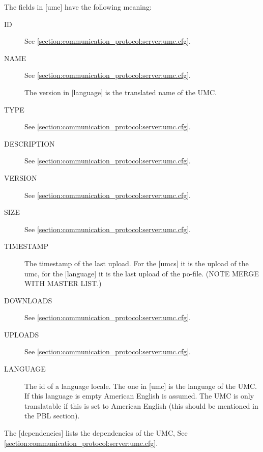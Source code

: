 The fields in [umc] have the following meaning:
\begin{description}
\item[ID]
	See \cref{section:communication_protocol:server:umc.cfg}.

\item[NAME]
	See \cref{section:communication_protocol:server:umc.cfg}.

	The version in [language] is the translated name of the UMC.

\item[TYPE]
	See \cref{section:communication_protocol:server:umc.cfg}.

\item[DESCRIPTION]
	See \cref{section:communication_protocol:server:umc.cfg}.

\item[VERSION]
	See \cref{section:communication_protocol:server:umc.cfg}.

\item[SIZE]
	See \cref{section:communication_protocol:server:umc.cfg}.

\item[TIMESTAMP]
	The timestamp of the last upload. For the [umcs] it is the upload
	of the umc, for the [language] it is the last upload of the
	po-file. (NOTE MERGE WITH MASTER LIST.)

\item[DOWNLOADS]
	See \cref{section:communication_protocol:server:umc.cfg}.

\item[UPLOADS]
	See \cref{section:communication_protocol:server:umc.cfg}.

\item[LANGUAGE]
	The id of a language locale. The one in [umc] is the language of
	the UMC. If this language is empty American English is assumed. The UMC
	is only translatable if this is set to American English (this should be
	mentioned in the PBL section).
\end{description}


The [dependencies] lists the dependencies of the UMC, See
\cref{section:communication_protocol:server:umc.cfg}.

